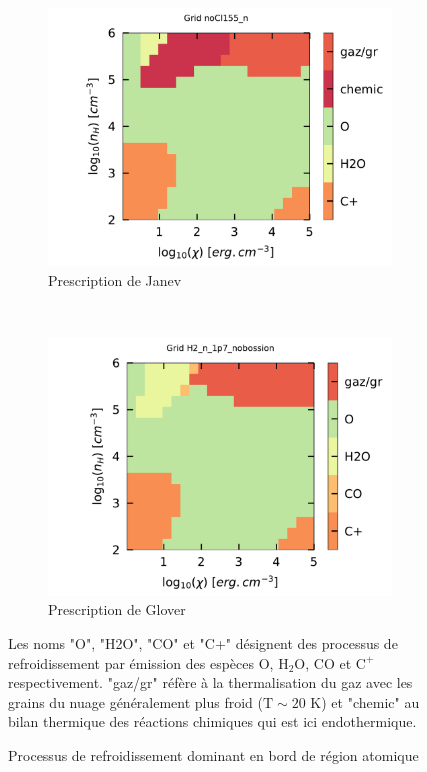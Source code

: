 \begin{appendices}
\begin{figure}[!p]
    \begin{subfigure}[t]{0.49\textwidth} %
        \centering \includegraphics[trim = {0 0 0 1cm },clip,width=1\textwidth]{figure/H2/grid_janev/mapLmax.pdf}
        \caption{Prescription de Janev}
    \end{subfigure}
    ~ 
    \begin{subfigure}[t]{0.49\textwidth}
        \centering \includegraphics[trim = {0 0 0 1cm },clip,width=1\textwidth]{figure/H2/grid_glover/mapLmax.pdf}
        \caption{Prescription de Glover}
    \end{subfigure}
    \caption{Processus de refroidissement dominant en bord de région atomique}
    \begin{minipage}{\textwidth}
    Les noms "O", "H2O", "CO" et "C+" désignent des processus de refroidissement par émission des espèces $\mathrm{O}$, $\mathrm{H}_2\mathrm{O}$, $\mathrm{CO}$ et $\mathrm{C}^+$ respectivement. "gaz/gr" réfère à la thermalisation du gaz avec les grains du nuage généralement plus froid ($\mathrm{T}\sim20$ K) et "chemic" au bilan thermique des réactions chimiques qui est ici endothermique.
    \end{minipage}
    \label{fig:H2:JanevGlover:Lmax}
\end{figure}



\end{appendices}
